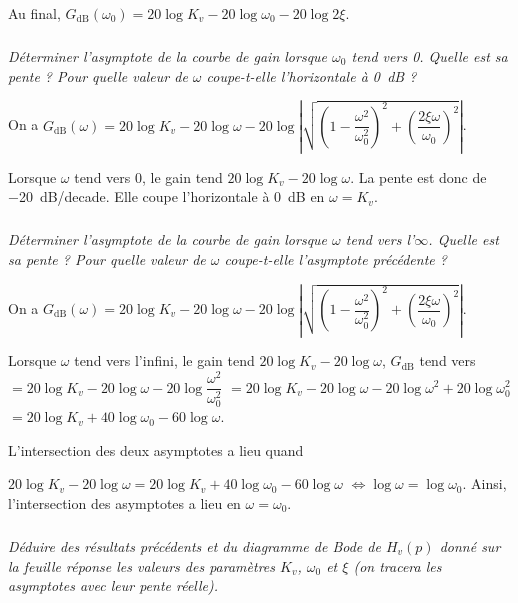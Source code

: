 \documentclass[10pt,fleqn]{article} %
\begin{document}
\begin{multicols}{2}
\begin{corrige}
Au final, 
$G_{\text{dB}}\left(\omega_0 \right)=
20\log K_v- 20\log  \omega_0 - 20\log 2\xi $.
\end{corrige} \else \fi

\subparagraph{}\textit{Déterminer l'asymptote de la courbe de gain lorsque 
$\omega_0$ tend vers 0. Quelle est sa pente ?
Pour quelle valeur de $\omega$ coupe-t-elle l'horizontale à \SI{0}{dB} ?}

\ifprof \begin{corrige}
On a $G_{\text{dB}}\left(\omega \right)
=20\log K_v- 20\log  \omega - 20\log  \left| \sqrt{\left(1- \dfrac{\omega^2}{\omega_0^2} \right)^2+\left( \dfrac{2\xi\omega }{\omega_0} \right)^2} \right|$. 

Lorsque $\omega$ tend vers 0, le gain tend $20\log K_v- 20\log  \omega$.
 La pente est donc de \SI{-20}{dB/decade}. Elle coupe l'horizontale à \SI{0}{dB} en $\omega=K_v$.

\end{corrige} \else \fi

\subparagraph{}\textit{Déterminer l'asymptote de la courbe de gain lorsque $\omega$ tend vers l'$\infty$. Quelle est sa pente ?	
Pour quelle valeur de $\omega$ coupe-t-elle l'asymptote précédente ?}


\ifprof \begin{corrige}
On a $G_{\text{dB}}\left(\omega \right)
=20\log K_v- 20\log  \omega - 20\log  \left| \sqrt{\left(1- \dfrac{\omega^2}{\omega_0^2} \right)^2+\left( \dfrac{2\xi\omega }{\omega_0} \right)^2} \right|$. 

Lorsque $\omega$ tend vers l'infini, le gain tend $20\log K_v- 20\log  \omega$, 
$G_{\text{dB}}$ tend vers 
$= 20\log K_v- 20\log  \omega - 20\log  \dfrac{\omega^2}{\omega_0^2} $
$= 20\log K_v- 20\log  \omega - 20\log  \omega^2 +20\log  \omega_0^2 $
$= 20\log K_v+ 40\log  \omega_0 - 60\log  \omega $.

L'intersection des deux asymptotes a lieu quand 

$20\log K_v- 20\log  \omega= 20\log K_v+40\log  \omega_0 - 60\log  \omega$
$\Leftrightarrow \log  \omega= \log  \omega_0 $. Ainsi, l'intersection des asymptotes a lieu en $\omega=\omega_0$. 
\end{corrige} \else \fi

\subparagraph{}\textit{Déduire des résultats précédents et du diagramme de Bode de $H_v(p)$ donné sur la feuille réponse les valeurs des paramètres $K_v$, $\omega_0$ et $\xi$ (on tracera les asymptotes avec leur pente réelle).}

\ifprof \begin{corrige}~\\


\end{corrige}
\end{multicols}
\end{document}
